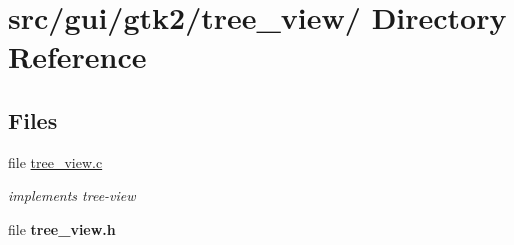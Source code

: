 \hypertarget{dir_000046}{
\section{src/gui/gtk2/tree\_\-view/ Directory Reference}
\label{dir_000046}
}
\subsection*{Files}
\begin{CompactItemize}
\item 
file \hyperlink{tree__view_8c}{tree\_\-view.c}
\begin{CompactList}\small\item\em implements tree-view \item\end{CompactList}

\item 
file {\bf tree\_\-view.h}
\end{CompactItemize}
